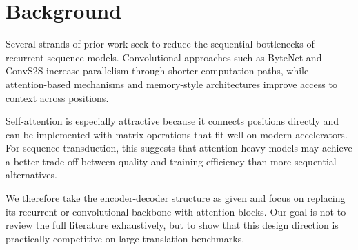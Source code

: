 \section{Background}

Several strands of prior work seek to reduce the sequential bottlenecks of recurrent sequence models. Convolutional approaches such as ByteNet and ConvS2S increase parallelism through shorter computation paths, while attention-based mechanisms and memory-style architectures improve access to context across positions.

Self-attention is especially attractive because it connects positions directly and can be implemented with matrix operations that fit well on modern accelerators. For sequence transduction, this suggests that attention-heavy models may achieve a better trade-off between quality and training efficiency than more sequential alternatives.

We therefore take the encoder-decoder structure as given and focus on replacing its recurrent or convolutional backbone with attention blocks. Our goal is not to review the full literature exhaustively, but to show that this design direction is practically competitive on large translation benchmarks.
